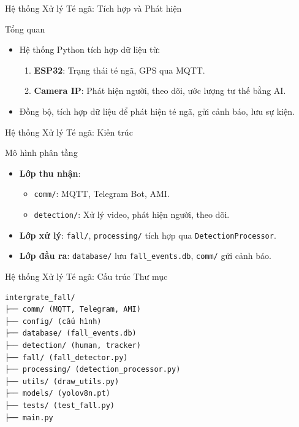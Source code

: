 \begin{frame}{Hệ thống Xử lý Té ngã: Tích hợp và Phát hiện}
    \begin{block}{Tổng quan}
        \begin{itemize}
            \item Hệ thống Python tích hợp dữ liệu từ:
            \begin{enumerate}
                \item \textbf{ESP32}: Trạng thái té ngã, GPS qua MQTT.
                \item \textbf{Camera IP}: Phát hiện người, theo dõi, ước lượng tư thế bằng AI.
            \end{enumerate}
            \item Đồng bộ, tích hợp dữ liệu để phát hiện té ngã, gửi cảnh báo, lưu sự kiện.
        \end{itemize}
    \end{block}
    \label{sec:server_overview}
\end{frame}

\begin{frame}{Hệ thống Xử lý Té ngã: Kiến trúc}
    \begin{block}{Mô hình phân tầng}
        \begin{itemize}
            \item \textbf{Lớp thu nhận}: 
                \begin{itemize}
                    \item \texttt{comm/}: MQTT, Telegram Bot, AMI.
                    \item \texttt{detection/}: Xử lý video, phát hiện người, theo dõi.
                \end{itemize}
            \item \textbf{Lớp xử lý}: \texttt{fall/}, \texttt{processing/} tích hợp qua \texttt{DetectionProcessor}.
            \item \textbf{Lớp đầu ra}: \texttt{database/} lưu \texttt{fall\_events.db}, \texttt{comm/} gửi cảnh báo.
        \end{itemize}
    \end{block}
    \label{subsubsec:system_overview}
\end{frame}

\begin{frame}[fragile]{Hệ thống Xử lý Té ngã: Cấu trúc Thư mục}
    \renewcommand{\baselinestretch}{0.8}
    \begin{verbatim}
intergrate_fall/
├── comm/ (MQTT, Telegram, AMI)
├── config/ (cấu hình)
├── database/ (fall_events.db)
├── detection/ (human, tracker)
├── fall/ (fall_detector.py)
├── processing/ (detection_processor.py)
├── utils/ (draw_utils.py)
├── models/ (yolov8n.pt)
├── tests/ (test_fall.py)
├── main.py
    \end{verbatim}
    \renewcommand{\baselinestretch}{1.0}
    \label{subsubsec:project_structure}
\end{frame}

